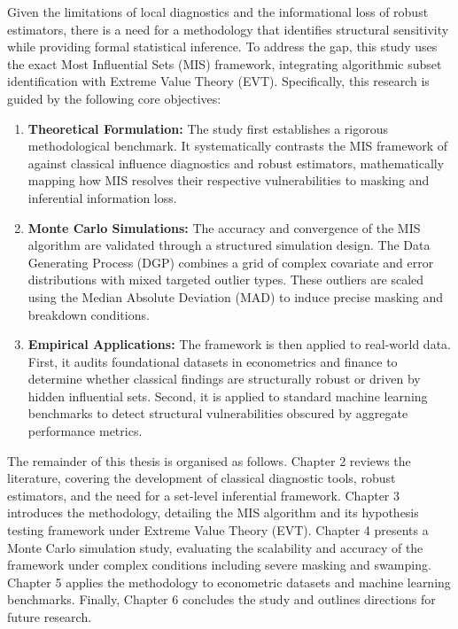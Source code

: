 \documentclass[../main.tex]{subfiles}
\begin{document}
Given the limitations of local diagnostics and the informational loss of robust estimators, there is a need for a methodology that identifies structural sensitivity while providing formal statistical inference. To address the gap, this study uses the exact Most Influential Sets (MIS) framework, integrating algorithmic subset identification with Extreme Value Theory (EVT). Specifically, this research is guided by the following core objectives:

\begin{enumerate}
	\item \textbf{Theoretical Formulation:} The study first establishes a rigorous methodological benchmark. It systematically contrasts the MIS framework of \parencite{kuschnig2021hidden} against classical influence diagnostics and robust estimators, mathematically mapping how MIS resolves their respective vulnerabilities to masking and inferential information loss.
	
	\item \textbf{Monte Carlo Simulations:} The accuracy and convergence of the MIS algorithm are validated through a structured simulation design. The Data Generating Process (DGP) combines a grid of complex covariate and error distributions with mixed targeted outlier types. These outliers are scaled using the Median Absolute Deviation (MAD) to induce precise masking and breakdown conditions.
	
	\item \textbf{Empirical Applications:} The framework is then applied to real-world data. First, it audits foundational datasets in econometrics and finance to determine whether classical findings are structurally robust or driven by hidden influential sets. Second, it is applied to standard machine learning benchmarks to detect structural vulnerabilities obscured by aggregate performance metrics.
	
\end{enumerate}

The remainder of this thesis is organised as follows. Chapter 2 reviews the literature, covering the development of classical diagnostic tools, robust estimators, and the need for a set-level inferential framework. Chapter 3 introduces the methodology, detailing the MIS algorithm and its hypothesis testing framework under Extreme Value Theory (EVT). Chapter 4 presents a Monte Carlo simulation study, evaluating the scalability and accuracy of the framework under complex conditions including severe masking and swamping. Chapter 5 applies the methodology to econometric datasets and machine learning benchmarks. Finally, Chapter 6 concludes the study and outlines directions for future research.
\end{document}
